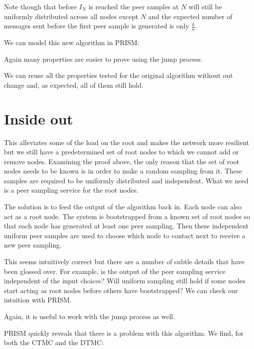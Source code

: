\documentclass[a4paper,10pt]{article}
\newcommand{\code}[1]{
  \footnotesize
  
}
\newcommand{\prismmodel}[1]{
  \begin{quotation}
  \code{../models/#1.sm}
  \end{quotation}
}
\begin{document}
Note though that before $I_N$ is reached the peer samples at $N$ will still be uniformly distributed across all nodes except $N$ and the expected number of messages sent before the first peer sample is generated is only $\frac{k}{n}$.

We can model this new algorithm in PRISM:

\prismmodel{ctmc_multiple}

Again many properties are easier to prove using the jump process.

\prismmodel{dtmc_multiple}

We can reuse all the properties tested for the original algorithm without out change and, as expected, all of them still hold.

\section{Inside out}

This alleviates some of the load on the root and makes the network more resilient but we still have a predetermined set of root nodes to which we cannot add or remove nodes. Examining the proof above, the only reason that the set of root nodes needs to be known is in order to make a random sampling from it. These samples are required to be uniformly distributed and independent. What we need is a peer sampling service for the root nodes.

The solution is to feed the output of the algorithm back in. Each node can also act as a root node. The system is bootstrapped from a known set of root nodes so that each node has generated at least one peer sampling. Then these independent uniform peer samples are used to choose which node to contact next to receive a new peer sampling.

This seems intuitively correct but there are a number of subtle details that have been glossed over. For example, is the output of the peer sampling service independent of the input choices? Will uniform sampling still hold if some nodes start acting as root nodes before others have bootstrapped? We can check our intuition with PRISM.

\prismmodel{ctmc_broken}

Again, it is useful to work with the jump process as well.

\prismmodel{dtmc_broken}

PRISM quickly reveals that there is a problem with this algorithm. We find, for both the CTMC and the DTMC:
\end{document}
